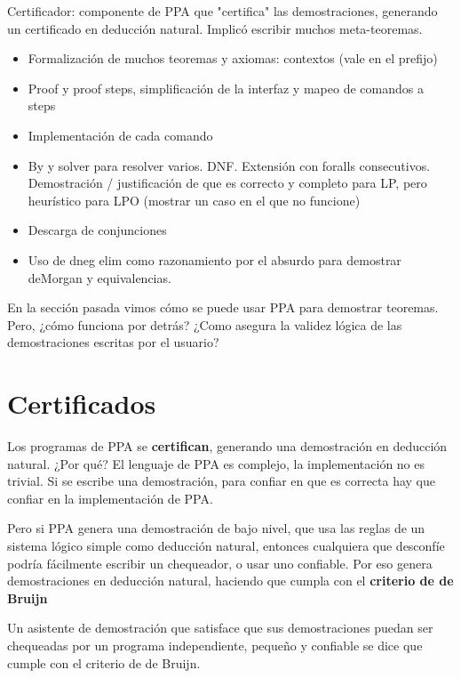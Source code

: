 Certificador: componente de PPA que "certifica" las demostraciones,
    generando un certificado en deducción natural. Implicó escribir muchos
    meta-teoremas.
    \begin{itemize}
        \item Formalización de muchos teoremas y axiomas: contextos (vale en el prefijo)
        \item Proof y proof steps, simplificación de la interfaz y mapeo de
        comandos a steps
        \item Implementación de cada comando
        \item By y solver para resolver varios. DNF. Extensión con foralls
        consecutivos. Demostración / justificación de que es correcto y completo
        para LP, pero heurístico para LPO (mostrar un caso en el que no funcione)
        \item Descarga de conjunciones
        \item Uso de dneg elim como razonamiento por el absurdo para demostrar
        deMorgan y equivalencias.
    \end{itemize}

En la sección pasada vimos cómo se puede usar PPA para demostrar teoremas. Pero,
¿cómo funciona por detrás? ¿Como asegura la validez lógica de las
demostraciones escritas por el usuario?

\section{Certificados}

Los programas de PPA se \textbf{certifican}, generando una demostración en
deducción natural. ¿Por qué? El lenguaje de PPA es complejo, la implementación
no es trivial. Si se escribe una demostración, para confiar en que es correcta
hay que confiar en la implementación de PPA.

Pero si PPA genera una demostración de bajo nivel, que usa las reglas de un
sistema lógico simple como deducción natural, entonces cualquiera que desconfíe
podría fácilmente escribir un chequeador, o usar uno confiable. Por eso genera
demostraciones en deducción natural, haciendo que cumpla con el \textbf{criterio
de de Bruijn}

\begin{definition} Un asistente de
    demostración que satisface que sus demostraciones puedan ser chequeadas por
    un programa independiente, pequeño y confiable se dice que cumple con el
    criterio de de Bruijn.
\end{definition}

